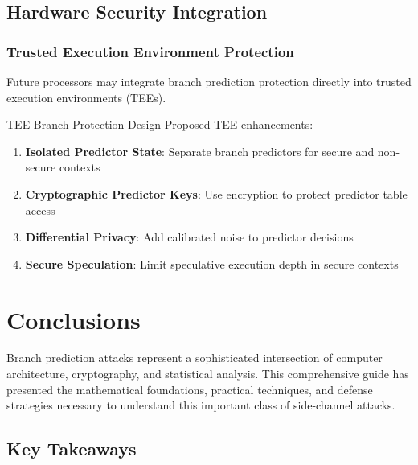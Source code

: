 \documentclass[11pt,a4paper]{article}
\theoremstyle{definition}
\begin{document}
\subsection{Hardware Security Integration}

\subsubsection{Trusted Execution Environment Protection}

Future processors may integrate branch prediction protection directly into trusted execution environments (TEEs).

\begin{securitybox}{TEE Branch Protection Design}
Proposed TEE enhancements:
\begin{enumerate}
    \item \textbf{Isolated Predictor State}: Separate branch predictors for secure and non-secure contexts
    \item \textbf{Cryptographic Predictor Keys}: Use encryption to protect predictor table access
    \item \textbf{Differential Privacy}: Add calibrated noise to predictor decisions
    \item \textbf{Secure Speculation}: Limit speculative execution depth in secure contexts
\end{enumerate}
\end{securitybox}

\section{Conclusions}

Branch prediction attacks represent a sophisticated intersection of computer architecture, cryptography, and statistical analysis. This comprehensive guide has presented the mathematical foundations, practical techniques, and defense strategies necessary to understand this important class of side-channel attacks.

\subsection{Key Takeaways}
\end{document}

